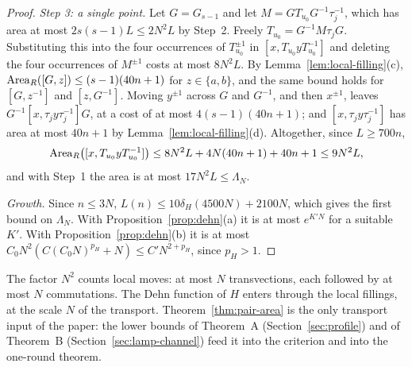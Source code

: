 \begin{proof}
\emph{Step 3: a single point.} Let $G=G_{s-1}$ and let $M=GT_{u_0}G^{-1}\tau_j^{-1}$, which has area at most $2s(s-1)L\le2N^2L$ by Step~2. Freely
$T_{u_0}=G^{-1}M\tau_jG$. Substituting this into the four occurrences of $T_{u_0}^{\pm1}$ in $[x,T_{u_0}yT_{u_0}^{-1}]$ and deleting the four
occurrences of $M^{\pm1}$ costs at most $8N^2L$. By Lemma~\ref{lem:local-filling}(c), $\operatorname{Area}_R([G,z])\le(s-1)(40n+1)$ for $z\in\{a,b\}$, and the
same bound holds for $[G,z^{-1}]$ and $[z,G^{-1}]$. Moving $y^{\pm1}$ across $G$ and $G^{-1}$, and then $x^{\pm1}$, leaves
$G^{-1}[x,\tau_jy\tau_j^{-1}]G$, at a cost of at most $4(s-1)(40n+1)$; and $[x,\tau_jy\tau_j^{-1}]$ has area at most $40n+1$ by
Lemma~\ref{lem:local-filling}(d). Altogether, since $L\ge700n$,
\[
\operatorname{Area}_R\bigl([x,T_{u_0}yT_{u_0}^{-1}]\bigr)\le8N^2L+4N(40n+1)+40n+1\le9N^2L,
\]
and with Step~1 the area is at most $17N^2L\le\Lambda_N$.

\emph{Growth.} Since $n\le3N$, $L(n)\le10\delta_H(4500N)+2100N$, which gives the first bound on $\Lambda_N$. With Proposition~\ref{prop:dehn}(a)
it is at most $e^{K'N}$ for a suitable $K'$. With Proposition~\ref{prop:dehn}(b) it is at most $C_0N^2(C(C_0N)^{p_H}+N)\le C'N^{2+p_H}$, since $p_H>1$.
\end{proof}

The factor $N^2$ counts local moves: at most $N$ transvections, each followed by at most $N$ commutations. The Dehn function of $H$ enters
through the local fillings, at the scale $N$ of the transport. Theorem~\ref{thm:pair-area} is the only transport input of the paper: the lower
bounds of Theorem~A (Section~\ref{sec:profile}) and of Theorem~B (Section~\ref{sec:lamp-channel}) feed it into the criterion and into the
one-round theorem.
